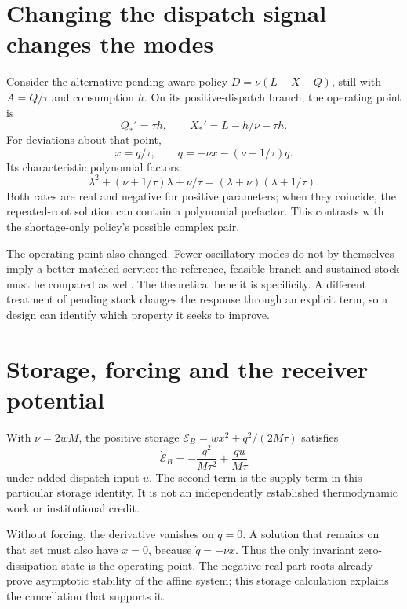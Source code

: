 \section{Changing the dispatch signal changes the modes}
Consider the alternative pending-aware policy $D=\nu(L-X-Q)$, still with $A=Q/\tau$ and consumption $h$. On its positive-dispatch branch, the operating point is
\begin{equation}
 Q_*'=\tau h,\qquad X_*'=L-h/\nu-\tau h.
\end{equation}
For deviations about that point,
\begin{equation}
 \dot x=q/\tau,\qquad
 \dot q=-\nu x-(\nu+1/\tau)q.
\end{equation}
Its characteristic polynomial factors:
\begin{equation}
 \lambda^2+(\nu+1/\tau)\lambda+\nu/\tau
 =(\lambda+\nu)(\lambda+1/\tau).
\end{equation}
Both rates are real and negative for positive parameters; when they coincide, the repeated-root solution can contain a polynomial prefactor. This contrasts with the shortage-only policy's possible complex pair.

The operating point also changed. Fewer oscillatory modes do not by themselves imply a better matched service: the reference, feasible branch and sustained stock must be compared as well. The theoretical benefit is specificity. A different treatment of pending stock changes the response through an explicit term, so a design can identify which property it seeks to improve.

\section{Storage, forcing and the receiver potential}
With $\nu=2wM$, the positive storage
$\mathcal E_B=wx^2+q^2/(2M\tau)$ satisfies
\begin{equation}
 \dot{\mathcal E}_B=-\frac{q^2}{M\tau^2}
 +\frac{qu}{M\tau}
\end{equation}
under added dispatch input $u$. The second term is the supply term in this particular storage identity. It is not an independently established thermodynamic work or institutional credit.

Without forcing, the derivative vanishes on $q=0$. A solution that remains on that set must also have $x=0$, because $\dot q=-\nu x$. Thus the only invariant zero-dissipation state is the operating point. The negative-real-part roots already prove asymptotic stability of the affine system; this storage calculation explains the cancellation that supports it.

